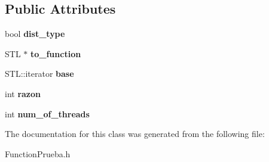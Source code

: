 \subsection*{Public Attributes}
\begin{DoxyCompactItemize}
\item 
\hypertarget{class_function_prueba_a9be1953b03cb653204cf10b1f2d6c5df}{bool {\bfseries dist\-\_\-type}}\label{class_function_prueba_a9be1953b03cb653204cf10b1f2d6c5df}

\item 
\hypertarget{class_function_prueba_afd6fedf6661db9b18f8f815abdf7ad1b}{S\-T\-L $\ast$ {\bfseries to\-\_\-function}}\label{class_function_prueba_afd6fedf6661db9b18f8f815abdf7ad1b}

\item 
\hypertarget{class_function_prueba_a738427545ba66c99252586d934bb4936}{S\-T\-L\-::iterator {\bfseries base}}\label{class_function_prueba_a738427545ba66c99252586d934bb4936}

\item 
\hypertarget{class_function_prueba_a47bd9740708d3d980150b32c12cbc067}{int {\bfseries razon}}\label{class_function_prueba_a47bd9740708d3d980150b32c12cbc067}

\item 
\hypertarget{class_function_prueba_a0f173b7655d0cd90c69902af6dfd70c1}{int {\bfseries num\-\_\-of\-\_\-threads}}\label{class_function_prueba_a0f173b7655d0cd90c69902af6dfd70c1}

\end{DoxyCompactItemize}


The documentation for this class was generated from the following file\-:\begin{DoxyCompactItemize}
\item 
Function\-Prueba.\-h\end{DoxyCompactItemize}
